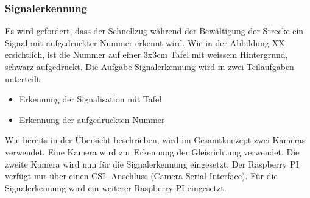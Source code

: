 \documentclass[../..main.tex]{subfiles}
\begin{document}
\subsubsection{Signalerkennung}
    Es wird gefordert, dass der Schnellzug während der Bewältigung der Strecke ein Signal mit aufgedruckter Nummer erkennt wird. Wie in der Abbildung XX ersichtlich, ist die Nummer auf einer 3x3cm Tafel mit weissem Hintergrund, schwarz aufgedruckt. Die Aufgabe Signalerkennung wird in zwei Teilaufgaben unterteilt:
    \begin{itemize}
        \item Erkennung der Signalisation mit Tafel
        \item Erkennung der aufgedruckten Nummer
    \end{itemize}
    Wie bereits in der Übersicht beschrieben, wird im Gesamtkonzept zwei Kameras verwendet. Eine Kamera wird zur Erkennung der Gleisrichtung verwendet. Die zweite Kamera wird nun für die Signalerkennung eingesetzt. Der Raspberry PI verfügt nur über einen CSI- Anschluss (Camera Serial Interface). Für die Signalerkennung wird ein weiterer Raspberry PI eingesetzt. 
\end{document}
